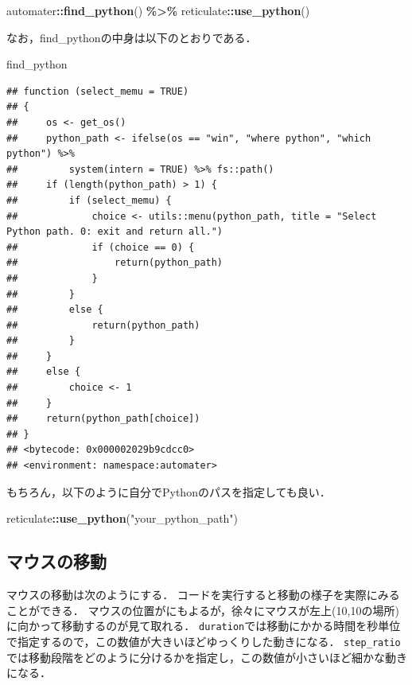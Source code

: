 \documentclass[
]{article}
\newenvironment{Shaded}{\begin{snugshade}}{\end{snugshade}}
\newcommand{\FunctionTok}[1]{\textcolor[rgb]{0.13,0.29,0.53}{\textbf{#1}}}
\newcommand{\NormalTok}[1]{#1}
\newcommand{\SpecialCharTok}[1]{\textcolor[rgb]{0.81,0.36,0.00}{\textbf{#1}}}
\newcommand{\StringTok}[1]{\textcolor[rgb]{0.31,0.60,0.02}{#1}}
\begin{document}
\begin{Shaded}
\begin{Highlighting}[]
\NormalTok{automater}\SpecialCharTok{::}\FunctionTok{find\_python}\NormalTok{() }\SpecialCharTok{\%\textgreater{}\%}
\NormalTok{  reticulate}\SpecialCharTok{::}\FunctionTok{use\_python}\NormalTok{()}
\end{Highlighting}
\end{Shaded}

なお，find\_pythonの中身は以下のとおりである．

\begin{Shaded}
\begin{Highlighting}[]
\NormalTok{find\_python}
\end{Highlighting}
\end{Shaded}

\begin{verbatim}
## function (select_memu = TRUE) 
## {
##     os <- get_os()
##     python_path <- ifelse(os == "win", "where python", "which python") %>% 
##         system(intern = TRUE) %>% fs::path()
##     if (length(python_path) > 1) {
##         if (select_memu) {
##             choice <- utils::menu(python_path, title = "Select Python path. 0: exit and return all.")
##             if (choice == 0) {
##                 return(python_path)
##             }
##         }
##         else {
##             return(python_path)
##         }
##     }
##     else {
##         choice <- 1
##     }
##     return(python_path[choice])
## }
## <bytecode: 0x000002029b9cdcc0>
## <environment: namespace:automater>
\end{verbatim}

もちろん，以下のように自分でPythonのパスを指定しても良い．

\begin{Shaded}
\begin{Highlighting}[]
\NormalTok{reticulate}\SpecialCharTok{::}\FunctionTok{use\_python}\NormalTok{(}\StringTok{"your\_python\_path"}\NormalTok{)}
\end{Highlighting}
\end{Shaded}

\hypertarget{ux30deux30a6ux30b9ux306eux79fbux52d5}{%
\subsection{マウスの移動}\label{ux30deux30a6ux30b9ux306eux79fbux52d5}}

マウスの移動は次のようにする．
コードを実行すると移動の様子を実際にみることができる．
マウスの位置がにもよるが，徐々にマウスが左上(10,10の場所)に向かって移動するのが見て取れる．
\texttt{duration}では移動にかかる時間を秒単位で指定するので，この数値が大きいほどゆっくりした動きになる．
\texttt{step\_ratio}では移動段階をどのように分けるかを指定し，この数値が小さいほど細かな動きになる．
\end{document}
